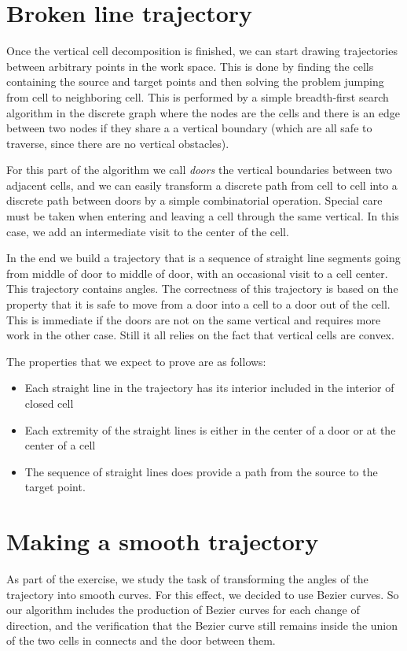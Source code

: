 \documentclass{easychair}
\begin{document}
\section{Broken line trajectory}
Once the vertical cell decomposition is finished, we can start drawing trajectories
between arbitrary points in the work space.  This is done by finding the cells containing
the source and target points and then solving the problem jumping from cell to neighboring
cell.  This is performed by a simple breadth-first search algorithm in the discrete graph
where the nodes are the cells and there is an edge between two nodes if they share a
a vertical boundary (which are all safe to traverse, since there are no vertical obstacles).

For this part of the algorithm we call {\em doors} the vertical boundaries between two
adjacent cells, and we can easily transform a discrete path from cell to cell into a discrete
path between doors by a simple combinatorial operation.  Special care must be taken when
entering and leaving a cell through the same vertical.  In this case, we add an intermediate
visit to the center of the cell.

In the end we build a trajectory that is a sequence of straight line segments going from
middle of door to middle of door, with an occasional visit to a cell center.  This trajectory
contains angles.  The correctness of this trajectory is based on the property that it is
safe to move from a door into a cell to a door out of the cell.  This is immediate if the
doors are not on the same vertical and requires more work in the other case.  Still it
all relies on the fact that vertical cells are convex.

The properties that we expect to prove are as follows:
\begin{itemize}
\item Each straight line in the trajectory has its interior included in the
interior of closed cell
\item Each extremity of the straight lines is either in the center of a door
or at the center of a cell
\item The sequence of straight lines does provide a path from the source to
the target point.
\end{itemize}

\section{Making a smooth trajectory}
As part of the exercise, we study the task of transforming the angles of the trajectory into
smooth curves.  For this effect, we decided to use Bezier curves.  So our algorithm includes
the production of Bezier curves for each change of direction, and the verification that
the Bezier curve still remains inside the union of the two cells in connects and the door
between them.
\end{document}
